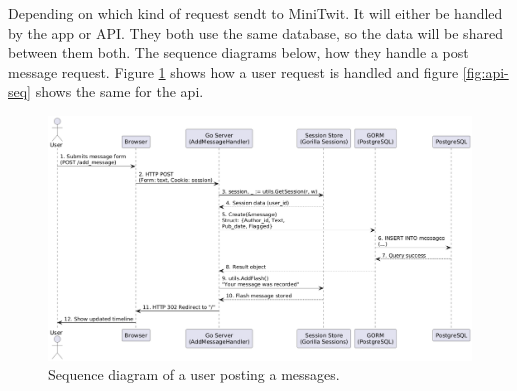 
Depending on which kind of request sendt to MiniTwit. It will either be handled by the app or API. They both use the same database, so the data will be shared between them both. The sequence diagrams below, how they handle a post message request. Figure \ref{fig:user-seq} shows how a user request is handled and figure \ref{fig:api-seq} shows the same for the api.

\begin{figure}[H]
\includegraphics[width=\textwidth]{images/user-seq-diagram.png}
\centering
\caption{Sequence diagram of a user posting a messages.}
\label{fig:user-seq}
\end{figure}
